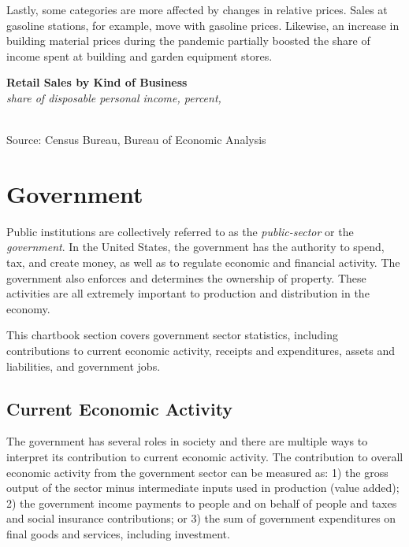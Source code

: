 \documentclass{report}
\newcommand{\tbllink}[1]{\href{https://raw.githubusercontent.com/bdecon/US-chartbook/master/chartbook/data/#1}{\faTable}}
\begin{document}
{\begin{minipage}{0.76\textwidth}
Lastly, some categories are more affected by changes in relative prices. Sales at gasoline stations, for example, move with gasoline prices. Likewise, an increase in building material prices during the pandemic partially boosted the share of income spent at building and garden equipment stores. 
\end{minipage}
\vspace{2mm}

\begin{minipage}{0.8\textwidth}
\normalsize \textbf{Retail Sales by Kind of Business}\\
\footnotesize{\textit{share of disposable personal income, percent, }}
\vspace{-1mm}

\hspace*{-2mm} \begin{tikzpicture}

\end{tikzpicture}\\
\footnotesize{Source: Census Bureau, Bureau of Economic Analysis} \hfill \tbllink{rs_ind.csv}
\end{minipage}
\newpage
\begin{minipage}{0.76\textwidth}
\hypertarget{gov}{\label{gov}}
\section*{Government} 
\small Public institutions are collectively referred to as the \textit{public-sector} or the \textit{government}. In the United States, the government has the authority to spend, tax, and create money, as well as to regulate economic and financial activity. The government also enforces and determines the ownership of property. These activities are all extremely important to production and distribution in the economy.

This chartbook section covers government sector statistics, including contributions to current economic activity, receipts and expenditures, assets and liabilities, and government jobs.
\subsection*{Current Economic Activity}
\small The government has several roles in society and there are multiple ways to interpret its contribution to current economic activity. The contribution to overall economic activity from the government sector can be measured as: 1) the gross output of the sector minus intermediate inputs used in production (value added); 2) the government income payments to people and on behalf of people and taxes and social insurance contributions; or 3) the sum of government expenditures on final goods and services, including investment. 


\end{minipage}}
\end{document}
